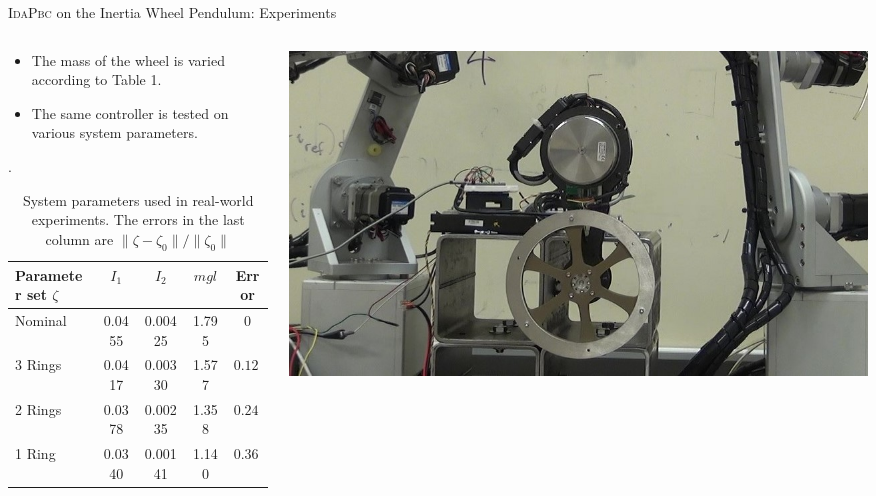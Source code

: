 \begin{frame}{\textsc{IdaPbc} on the Inertia Wheel Pendulum: Experiments}
    \begin{columns}[c]
        \begin{column}{0.5\linewidth}
            \begin{itemize}
                \item The mass of the wheel is varied according to Table 1.
                \item The same controller is tested on various system parameters.
            \end{itemize}
            \begin{table}
                \centering
                \footnotesize
                \caption{System parameters used in real-world experiments. The errors in the
                last column are $\|\zeta - \zeta_0\| / \|\zeta_0\|$}.
                \begin{tabular}{lcccc}
                  \toprule
                  Parameter set $\zeta$ & $I_1$ & $I_2$ & $mgl$ & Error \\
                  \midrule
                  Nominal & 0.0455 & 0.00425 & 1.795 & 0 \\
                  3 Rings & 0.0417 & 0.00330 & 1.577 & $0.122$ \\
                  2 Rings & 0.0378 & 0.00235 & 1.358 & $0.243$ \\
                  1 Ring & 0.0340 & 0.00141 & 1.140 & $0.365$ \\
                  \bottomrule
                \end{tabular}
                \label{tab:modified_params}
              \end{table}
        \end{column}
        \begin{column}{0.5\linewidth}
            \includegraphics[width=0.6\linewidth, center]{figures/4_rings_Moment (2).jpg}
            \begin{figure}
                \centering

\end{figure}
\end{column}
\end{columns}
\end{frame}
